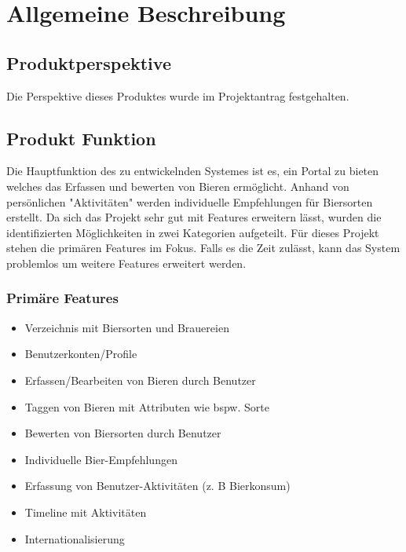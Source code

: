 \documentclass[10pt,a4paper]{scrartcl}
\begin{document}
\section{Allgemeine Beschreibung}
\subsection{Produktperspektive}
Die Perspektive dieses Produktes wurde im Projektantrag festgehalten.

\subsection{Produkt Funktion}
Die Hauptfunktion des zu entwickelnden Systemes ist es, ein Portal zu bieten welches das Erfassen und bewerten von Bieren ermöglicht. Anhand von persönlichen "Aktivitäten" werden individuelle Empfehlungen für Biersorten erstellt. Da sich das Projekt sehr gut mit Features erweitern lässt, wurden die identifizierten Möglichkeiten in zwei Kategorien aufgeteilt. Für dieses Projekt stehen die primären Features im Fokus. Falls es die Zeit zulässt, kann das System problemlos um weitere Features erweitert werden.

\subsubsection{Primäre Features}
\begin{itemize}
\item Verzeichnis mit Biersorten und Brauereien
\item Benutzerkonten/Profile
\item Erfassen/Bearbeiten von Bieren durch Benutzer
\item Taggen von Bieren mit Attributen wie bspw. Sorte
\item Bewerten von Biersorten durch Benutzer
\item Individuelle Bier-Empfehlungen
\item Erfassung von Benutzer-Aktivitäten (z. B Bierkonsum)
\item Timeline mit Aktivitäten
\item Internationalisierung 
\end{itemize}
\end{document}
